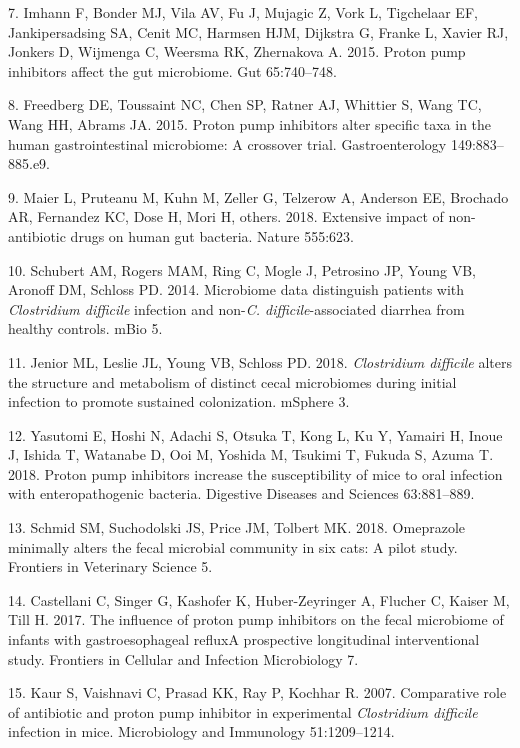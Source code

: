 \documentclass[11pt,]{article}
\begin{document}
\hypertarget{ref-Imhann2015}{}
7. Imhann F, Bonder MJ, Vila AV, Fu J, Mujagic Z, Vork L, Tigchelaar EF,
Jankipersadsing SA, Cenit MC, Harmsen HJM, Dijkstra G, Franke L, Xavier
RJ, Jonkers D, Wijmenga C, Weersma RK, Zhernakova A. 2015. Proton pump
inhibitors affect the gut microbiome. Gut 65:740--748.

\hypertarget{ref-Freedberg2015}{}
8. Freedberg DE, Toussaint NC, Chen SP, Ratner AJ, Whittier S, Wang TC,
Wang HH, Abrams JA. 2015. Proton pump inhibitors alter specific taxa in
the human gastrointestinal microbiome: A crossover trial.
Gastroenterology 149:883--885.e9.

\hypertarget{ref-maier2018extensive}{}
9. Maier L, Pruteanu M, Kuhn M, Zeller G, Telzerow A, Anderson EE,
Brochado AR, Fernandez KC, Dose H, Mori H, others. 2018. Extensive
impact of non-antibiotic drugs on human gut bacteria. Nature 555:623.

\hypertarget{ref-Schuberte01021-14}{}
10. Schubert AM, Rogers MAM, Ring C, Mogle J, Petrosino JP, Young VB,
Aronoff DM, Schloss PD. 2014. Microbiome data distinguish patients with
\emph{Clostridium difficile} infection and non-\emph{C.
difficile}-associated diarrhea from healthy controls. mBio 5.

\hypertarget{ref-Jenior2018}{}
11. Jenior ML, Leslie JL, Young VB, Schloss PD. 2018. \emph{Clostridium
difficile} alters the structure and metabolism of distinct cecal
microbiomes during initial infection to promote sustained colonization.
mSphere 3.

\hypertarget{ref-Yasutomi2018}{}
12. Yasutomi E, Hoshi N, Adachi S, Otsuka T, Kong L, Ku Y, Yamairi H,
Inoue J, Ishida T, Watanabe D, Ooi M, Yoshida M, Tsukimi T, Fukuda S,
Azuma T. 2018. Proton pump inhibitors increase the susceptibility of
mice to oral infection with enteropathogenic bacteria. Digestive
Diseases and Sciences 63:881--889.

\hypertarget{ref-Schmid2018}{}
13. Schmid SM, Suchodolski JS, Price JM, Tolbert MK. 2018. Omeprazole
minimally alters the fecal microbial community in six cats: A pilot
study. Frontiers in Veterinary Science 5.

\hypertarget{ref-Castellani2017}{}
14. Castellani C, Singer G, Kashofer K, Huber-Zeyringer A, Flucher C,
Kaiser M, Till H. 2017. The influence of proton pump inhibitors on the
fecal microbiome of infants with gastroesophageal refluxA prospective
longitudinal interventional study. Frontiers in Cellular and Infection
Microbiology 7.

\hypertarget{ref-Kaur2007}{}
15. Kaur S, Vaishnavi C, Prasad KK, Ray P, Kochhar R. 2007. Comparative
role of antibiotic and proton pump inhibitor in experimental
\emph{Clostridium difficile} infection in mice. Microbiology and
Immunology 51:1209--1214.
\end{document}

